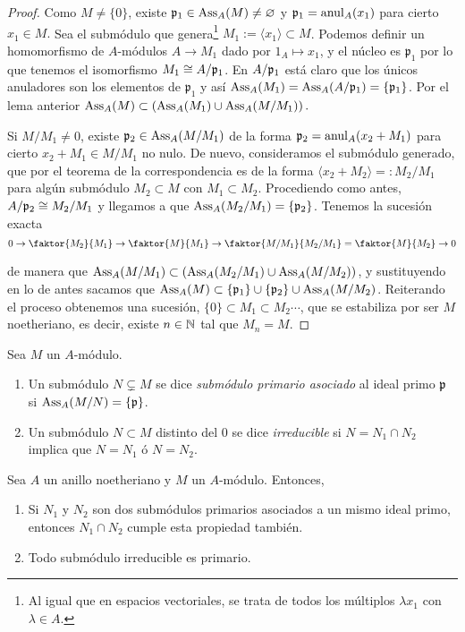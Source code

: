 \documentclass[../main.tex]{subfiles}
\begin{document}
\begin{proof}
Como $M\neq\{0\}$, existe $\mathfrak{p}_1\in\text{Ass}_A(M)\neq\varnothing$ y $\mathfrak{p}_1=\operatorname{anul}_A(x_1)$ para cierto $x_1\in M.$ Sea el submódulo que genera\footnote{Al igual que en espacios vectoriales, se trata de todos los múltiplos $\lambda x_1$ con $\lambda\in A$.}
$M_1:=\langle x_1\rangle\subset M$. Podemos definir un homomorfismo de $A$-módulos $A\to M_1$ dado por $1_A\mapsto x_1$, y el núcleo es $\mathfrak{p}_1$ por lo que tenemos el isomorfismo $M_1\cong A/{\mathfrak{p}_1}$. En $A/{\mathfrak{p}_1}$ está claro que los únicos anuladores son los elementos de $\mathfrak{p_1}$ y así $\text{Ass}_A(M_1)=\text{Ass}_A(A/\mathfrak{p}_1) = \{\mathfrak{p}_1\}$.
Por el lema anterior $\text{Ass}_A(M)\subset \left ( \text{Ass}_A(M_1)\cup\text{Ass}_A{(M/M_1) } \right).$

Si $M/M_1\neq 0$, existe $\mathfrak{p}_2\in\text{Ass}_A(M/M_1)$ de la forma $\mathfrak{p}_2=\operatorname{anul}_A(x_2+ M_1)$ para cierto $x_2+ M_1\in M/M_1$ no nulo. De nuevo, consideramos el submódulo generado, que por el teorema de la correspondencia es de la forma $\langle x_2 + M_2 \rangle =: M_2/M_1$ para algún submódulo $M_2\subset M$ con $M_1\subset M_2$. Procediendo como antes, $A/{\mathfrak{p}_2}\cong M_2/M_1$ y llegamos a que $\text{Ass}_A(M_2/M_1)=\{\mathfrak{p}_2\}$.
Tenemos la sucesión exacta
\begin{equation}
  0 \to \faktor{M_2}{M_1} \to \faktor{M}{M_1} \to \faktor{M/M_1}{M_2/M_1} = \faktor{M}{M_2}  \to 0
\end{equation}

de manera que $\text{Ass}_A(M/M_1) \subset \left (\text{Ass}_A (M_2/M_1) \cup \text{Ass}_A(M/M_2) \right )$, y sustituyendo en lo de antes sacamos que $\text{Ass}_A(M)\subset \{\mathfrak{p}_1\}\cup\{\mathfrak{p}_2\}\cup\text{Ass}_A(M/M_2)$. Reiterando el proceso obtenemos una sucesión, $\{0\}\subset M_1\subset M_2\cdots$, que se estabiliza por ser $M$ noetheriano, es decir, existe $n\in\mathbb{N}$ tal que $M_n=M.$
\end{proof}

\begin{definition} Sea $M$ un $A$-módulo. \begin{enumerate}
    \item Un submódulo $N\varsubsetneq M$ se dice \textit{submódulo primario asociado} al ideal primo $\mathfrak{p}$ si $\text{Ass}_A(M/N)=\{\mathfrak{p}\}$.
    \item Un submódulo $N\subset M$ distinto del $0$ se dice \textit{irreducible} si $N=N_1\cap N_2$ implica que $N=N_1$ ó $N=N_2$.
\end{enumerate}
\end{definition}

\begin{lemma}
Sea $A$ un anillo noetheriano y $M$ un $A$-módulo. Entonces,\begin{enumerate}
    \item Si $N_1$ y $N_2$ son dos submódulos primarios asociados a un mismo ideal primo, entonces $N_1\cap N_2$ cumple esta propiedad también.
    \item Todo submódulo irreducible es primario.
\end{enumerate}
\end{lemma}
\end{document}
